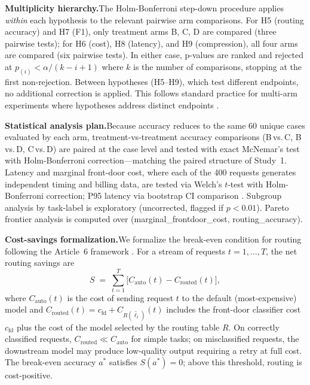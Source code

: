 \documentclass{article}
\begin{document}
\textbf{Multiplicity hierarchy.}\quad The Holm-Bonferroni step-down procedure applies \emph{within} each hypothesis to the relevant pairwise arm comparisons. For H5 (routing accuracy) and H7 (F1), only treatment arms B, C, D are compared (three pairwise tests); for H6 (cost), H8 (latency), and H9 (compression), all four arms are compared (six pairwise tests). In either case, p-values are ranked and rejected at $p_{(i)} < \alpha / (k - i + 1)$ where $k$ is the number of comparisons, stopping at the first non-rejection. Between hypotheses (H5--H9), which test different endpoints, no additional correction is applied. This follows standard practice for multi-arm experiments where hypotheses address distinct endpoints \citep{schulz2010consort,kohavi2020trustworthy}.

\textbf{Statistical analysis plan.}\quad Because accuracy reduces to the same 60 unique cases evaluated by each arm, treatment-vs-treatment accuracy comparisons (B\,vs.\,C, B\,vs.\,D, C\,vs.\,D) are paired at the case level and tested with exact McNemar's test \citep{mcnemar1947} with Holm-Bonferroni correction---matching the paired structure of Study~1. Latency and marginal front-door cost, where each of the 400 requests generates independent timing and billing data, are tested via Welch's $t$-test \citep{welch1947} with Holm-Bonferroni correction; P95 latency via bootstrap CI comparison \citep{efron1979bootstrap}. Subgroup analysis by task-label is exploratory (uncorrected, flagged if $p < 0.01$). Pareto frontier analysis is computed over (marginal\_front\-door\_cost, routing\_accuracy).

\textbf{Cost-savings formalization.}\quad We formalize the break-even condition for routing following the Article~6 framework \citep{johnson2026rct}. For a stream of requests $t = 1, \ldots, T$, the net routing savings are
\begin{equation}
  S \;=\; \sum_{t=1}^{T} \bigl[C_{\text{auto}}(t) - C_{\text{routed}}(t)\bigr],
  \label{eq:savings}
\end{equation}
where $C_{\text{auto}}(t)$ is the cost of sending request $t$ to the default (most-expensive) model and $C_{\text{routed}}(t) = c_{\text{fd}} + C_{R(\hat{\ell}_t)}(t)$ includes the front-door classifier cost $c_{\text{fd}}$ plus the cost of the model selected by the routing table $R$. On correctly classified requests, $C_{\text{routed}} \ll C_{\text{auto}}$ for simple tasks; on misclassified requests, the downstream model may produce low-quality output requiring a retry at full cost. The break-even accuracy $a^*$ satisfies $S(a^*) = 0$; above this threshold, routing is cost-positive.
\end{document}
